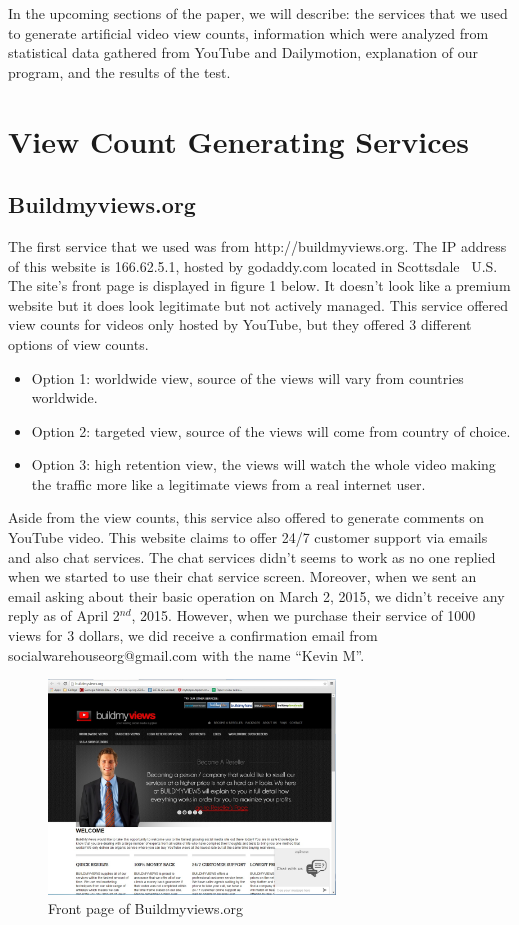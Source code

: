 \documentclass[conference]{IEEEtran}
\begin{document}
In the upcoming sections of the paper, we will describe: the services that we used to generate artificial video view counts, information which were analyzed from statistical data gathered from YouTube and Dailymotion, explanation of our program, and the results of the test.

\section{View Count Generating Services}

\subsection{Buildmyviews.org}
The first service that we used was from http://buildmyviews.org. The IP address of this website is 166.62.5.1, hosted by godaddy.com located in Scottsdale~\cite{c6} U.S. The site’s front page is displayed in figure 1 below. It doesn't look like a premium website but it does look legitimate but not actively managed. This service offered view counts for videos only hosted by YouTube, but they offered 3 different options of view counts.

\begin{itemize}
  \item Option 1: worldwide view, source of the views will vary from countries worldwide.
  \item Option 2: targeted view, source of the views will come from country of choice.
  \item Option 3: high retention view, the views will watch the whole video making the traffic more like a legitimate views from a real internet user.
\end{itemize}

Aside from the view counts, this service also offered to generate comments on YouTube video. This website claims to offer 24/7 customer support via emails and also chat services. The chat services didn't seems to work as no one replied when we started to use their chat service screen. Moreover, when we sent an email asking about their basic operation on March 2, 2015, we didn't receive any reply as of April 2$^{nd}$, 2015. However, when we purchase their service of 1000 views for 3 dollars, we did receive a confirmation email from socialwarehouseorg@gmail.com with the name ``Kevin M''.

\begin{figure}
  \centering
  \includegraphics[width=3.0in]{fig1}
  \caption{Front page of Buildmyviews.org}
\end{figure}
\end{document}
